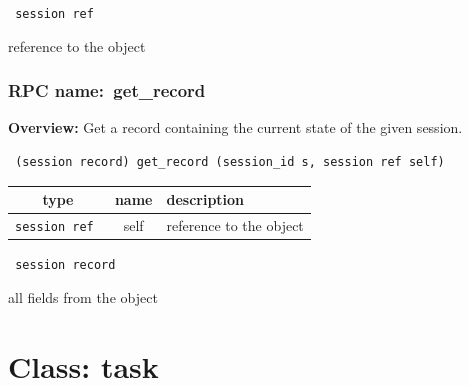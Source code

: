 \vspace{0.3cm}

{\tt 
session ref
}


reference to the object
\vspace{0.3cm}
\vspace{0.3cm}
\vspace{0.3cm}
\subsubsection{RPC name:~get\_record}

{\bf Overview:} 
Get a record containing the current state of the given session.

\begin{verbatim} (session record) get_record (session_id s, session ref self)\end{verbatim}



 
\vspace{0.3cm}
\begin{tabular}{|c|c|p{7cm}|}
 \hline
{\bf type} & {\bf name} & {\bf description} \\ \hline
{\tt session ref } & self & reference to the object \\ \hline 

\end{tabular}

\vspace{0.3cm}

{\tt 
session record
}


all fields from the object
\vspace{0.3cm}
\vspace{0.3cm}
\vspace{0.3cm}

\vspace{1cm}
\newpage
\section{Class: task}

